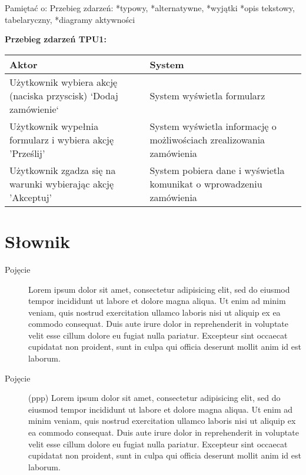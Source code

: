 \documentclass[a4paper,titlepage,twoside,openright]{report} %
\begin{document}
		Pamiętać o:\newline
		Przebieg zdarzeń:\newline
		*typowy,\newline
		*alternatywne,\newline
		*wyjątki\newline
		*opis tekstowy, tabelaryczny,\newline
		*diagramy aktywności\newline

		\begin {center}
		{\bf Przebieg zdarzeń TPU1:}\newline
		\begin{tabular}{|p{6cm}|p{6cm}|}
		  \hline
		  {\bf Aktor} & {\bf System }\\ \hline
		  \hline \hline
		  Użytkownik wybiera akcję (naciska przyscisk) `Dodaj zamówienie` & System wyświetla formularz \\ \hline
		  Użytkownik wypełnia formularz i wybiera akcję 'Prześlij' & System wyświetla informację o możliwościach zrealizowania zamówienia\\ \hline
		  Użytkownik zgadza się na warunki wybierając akcję 'Akceptuj' & System pobiera dane i wyświetla komunikat o wprowadzeniu zamówienia \\
		  \hline
		\end{tabular}
		\end{center}
		
\cleardoublepage

\chapter*{Słownik}
		
		\begin{description}
			\item[Pojęcie]
				Lorem ipsum dolor sit amet, consectetur adipisicing elit, sed do eiusmod tempor incididunt 
				ut labore et dolore magna aliqua. Ut enim ad 	minim veniam, quis nostrud exercitation 
				ullamco laboris nisi ut aliquip ex ea commodo consequat. Duis aute irure dolor in reprehenderit 
				in voluptate velit esse cillum dolore eu fugiat nulla pariatur. Excepteur sint occaecat 
				cupidatat non proident, sunt in culpa qui officia deserunt mollit anim id est laborum.				
			\item[Pojęcie] (ppp) 
				Lorem ipsum dolor sit amet, consectetur adipisicing elit, sed do eiusmod tempor incididunt 
				ut labore et dolore magna aliqua. Ut enim ad 	minim veniam, quis nostrud exercitation 
				ullamco laboris nisi ut aliquip ex ea commodo consequat. Duis aute irure dolor in reprehenderit 
				in voluptate velit esse cillum dolore eu fugiat nulla pariatur. Excepteur sint occaecat 
				cupidatat non proident, sunt in culpa qui officia deserunt mollit anim id est laborum.
		\end{description}
	
\end{document}
